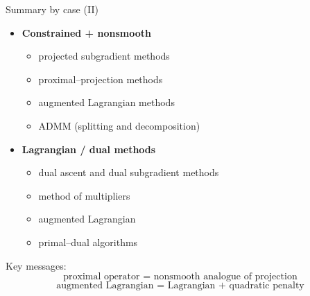 \documentclass[aspectratio=169]{beamer}
\begin{document}
\begin{frame}{Summary by case (II)}

\begin{itemize}

    \item \textbf{Constrained + nonsmooth}  
    \begin{itemize}
        \item projected subgradient methods
        \item proximal–projection methods
        \item augmented Lagrangian methods
        \item ADMM (splitting and decomposition)
    \end{itemize}

    \item \textbf{Lagrangian / dual methods}  
    \begin{itemize}
        \item dual ascent and dual subgradient methods
        \item method of multipliers
        \item augmented Lagrangian
        \item primal–dual algorithms
    \end{itemize}

\end{itemize}

\bigskip

Key messages:
\[
\text{proximal operator = nonsmooth analogue of projection}
\]
\[
\text{augmented Lagrangian = Lagrangian + quadratic penalty}
\]

\end{frame}
\end{document}
